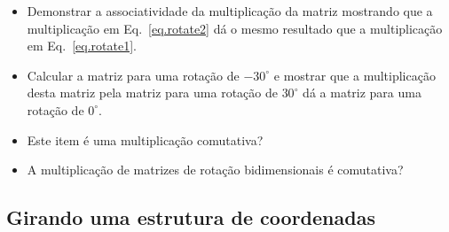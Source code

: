 \begin{framed}
\begin{itemize}
\item Demonstrar a associatividade da multiplicação da matriz mostrando que a multiplicação em Eq.~\ref{eq.rotate2} dá o mesmo resultado que a multiplicação em Eq.~\ref{eq.rotate1}.
\item Calcular a matriz para uma rotação de $-30^{\circ}$ e mostrar que a multiplicação desta matriz pela matriz para uma rotação de $30^{\circ}$ dá a matriz para uma rotação de $0^{\circ}$.
\item Este item é uma multiplicação comutativa?
\item A multiplicação de matrizes de rotação bidimensionais é comutativa?
\end{itemize}
\end{framed}

\subsection{Girando uma estrutura de coordenadas}

